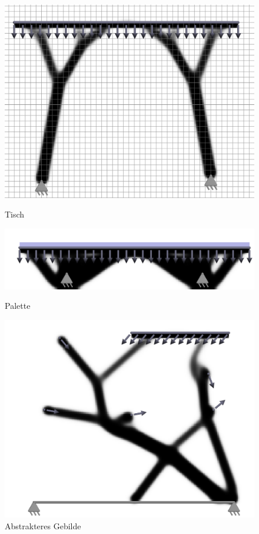 \documentclass{article}
\begin{document}
\begin{figure}[H]
    \begin{minipage}{0.25\textwidth}
        \centering
        \includegraphics[width=\linewidth]{figures/tisch.png}
        \caption{Tisch}
    \end{minipage}\hfill
    \begin{minipage}{0.25\textwidth}
        \centering
        \includegraphics[width=\linewidth]{figures/Palette.png}
        \caption{Palette}
    \end{minipage}\hfill
    \begin{minipage}{0.25\textwidth}
        \centering
        \includegraphics[width=\linewidth]{figures/abstrakt.png}
        \caption{Abstrakteres Gebilde}
        \label{fig:abstrakt}
    \end{minipage}
\end{figure}
\end{document}
